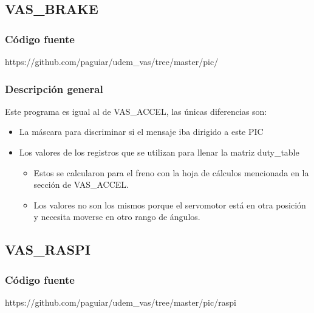 \subsection{VAS\_BRAKE}
\subsubsection{Código fuente}
https://github.com/paguiar/udem\_vas/tree/master/pic/

\subsubsection{Descripción general}
Este programa es igual al de VAS\_ACCEL, las únicas diferencias son:
\begin{itemize}
\item La máscara para discriminar si el mensaje iba dirigido a este PIC
\item Los valores de los registros que se utilizan para llenar la matriz duty\_table
 \begin{itemize}
  \item Estos se calcularon para el freno con la hoja de cálculos mencionada en la sección de VAS\_ACCEL.
  \item Los valores no son los mismos porque el servomotor está en otra posición y necesita moverse en otro rango de ángulos.
 \end{itemize}
\end{itemize}

\subsection{VAS\_RASPI}
\subsubsection{Código fuente}
https://github.com/paguiar/udem\_vas/tree/master/pic/raspi 
